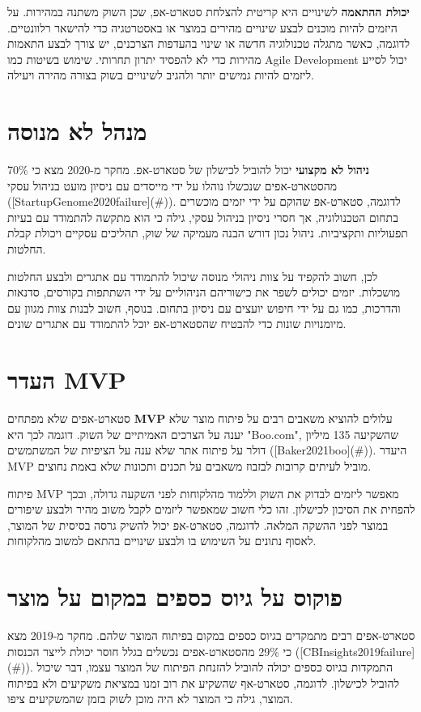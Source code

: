 \textbf{יכולת ההתאמה} לשינויים היא קריטית להצלחת סטארט-אפ, שכן השוק משתנה במהירות. על היזמים להיות מוכנים לבצע שינויים מהירים במוצר או באסטרטגיה כדי להישאר רלוונטיים. לדוגמה, כאשר מתגלה טכנולוגיה חדשה או שינוי בהעדפות הצרכנים, יש צורך לבצע התאמות מהירות כדי לא להפסיד יתרון תחרותי. שימוש בשיטות כמו Agile Development יכול לסייע ליזמים להיות גמישים יותר ולהגיב לשינויים בשוק בצורה מהירה ויעילה.

\section{מנהל לא מנוסה}
\textbf{ניהול לא מקצועי} יכול להוביל לכישלון של סטארט-אפ. מחקר מ-2020 מצא כי 70\% מהסטארט-אפים שנכשלו נוהלו על ידי מייסדים עם ניסיון מועט בניהול עסקי ([StartupGenome2020failure](\#)). לדוגמה, סטארט-אפ שהוקם על ידי יזמים מוכשרים בתחום הטכנולוגיה, אך חסרי ניסיון בניהול עסקי, גילה כי הוא מתקשה להתמודד עם בעיות תפעוליות ותקציביות. ניהול נכון דורש הבנה מעמיקה של שוק, תהליכים עסקיים ויכולת קבלת החלטות.

לכן, חשוב להקפיד על צוות ניהולי מנוסה שיכול להתמודד עם אתגרים ולבצע החלטות מושכלות. יזמים יכולים לשפר את כישוריהם הניהוליים על ידי השתתפות בקורסים, סדנאות והדרכות, כמו גם על ידי חיפוש יועצים עם ניסיון בתחום. בנוסף, חשוב לבנות צוות מגוון עם מיומנויות שונות כדי להבטיח שהסטארט-אפ יוכל להתמודד עם אתגרים שונים.

\section{העדר MVP}
סטארט-אפים שלא מפתחים \textbf{MVP } עלולים להוציא משאבים רבים על פיתוח מוצר שלא יענה על הצרכים האמיתיים של השוק. דוגמה לכך היא "Boo.com", שהשקיעה 135 מיליון דולר על פיתוח אתר שלא ענה על הציפיות של המשתמשים ([Baker2021boo](\#)). היעדר MVP מוביל לעיתים קרובות לבזבוז משאבים על תכנים ותכונות שלא באמת נחוצים.

פיתוח MVP מאפשר ליזמים לבדוק את השוק וללמוד מהלקוחות לפני השקעה גדולה, ובכך להפחית את הסיכון לכישלון. זהו כלי חשוב שמאפשר ליזמים לקבל משוב מהיר ולבצע שיפורים במוצר לפני ההשקה המלאה. לדוגמה, סטארט-אפ יכול להשיק גרסה בסיסית של המוצר, לאסוף נתונים על השימוש בו ולבצע שינויים בהתאם למשוב מהלקוחות.

\section{פוקוס על גיוס כספים במקום על מוצר}
סטארט-אפים רבים מתמקדים בגיוס כספים במקום בפיתוח המוצר שלהם. מחקר מ-2019 מצא כי 29\% מהסטארט-אפים נכשלים בגלל חוסר יכולת לייצר הכנסות ([CBInsights2019failure](\#)). התמקדות בגיוס כספים יכולה להוביל להזנחת הפיתוח של המוצר עצמו, דבר שיכול להוביל לכישלון. לדוגמה, סטארט-אף שהשקיע את רוב זמנו במציאת משקיעים ולא בפיתוח המוצר, גילה כי המוצר לא היה מוכן לשוק בזמן שהמשקיעים ציפו.

